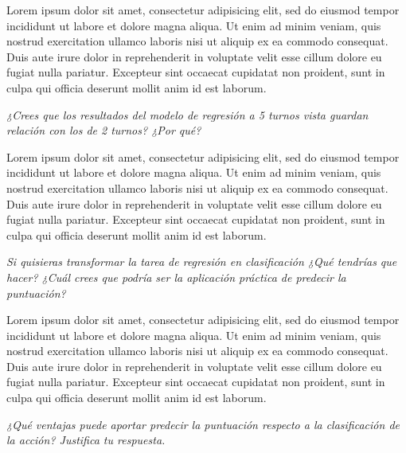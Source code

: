 \documentclass[12pt]{article}
\begin{document}
Lorem ipsum dolor sit amet, consectetur adipisicing elit, sed do eiusmod tempor incididunt ut labore et dolore magna aliqua. Ut enim ad minim veniam, quis nostrud exercitation ullamco laboris nisi ut aliquip ex ea commodo consequat. Duis aute irure dolor in reprehenderit in voluptate velit esse cillum dolore eu fugiat nulla pariatur. Excepteur sint occaecat cupidatat non proident, sunt in culpa qui officia deserunt mollit anim id est laborum.

\begin{center}
    \vspace{0.5cm} \emph{¿Crees que los resultados del modelo de regresión a 5 turnos vista guardan relación con los de 2 turnos? ¿Por qué?}
    \vspace{0.5cm}
\end{center}

Lorem ipsum dolor sit amet, consectetur adipisicing elit, sed do eiusmod tempor incididunt ut labore et dolore magna aliqua. Ut enim ad minim veniam, quis nostrud exercitation ullamco laboris nisi ut aliquip ex ea commodo consequat. Duis aute irure dolor in reprehenderit in voluptate velit esse cillum dolore eu fugiat nulla pariatur. Excepteur sint occaecat cupidatat non proident, sunt in culpa qui officia deserunt mollit anim id est laborum.

\begin{center}
    \vspace{0.5cm} \emph{Si quisieras transformar la tarea de regresión en clasificación ¿Qué tendrías que hacer? ¿Cuál crees que podría ser la aplicación práctica de predecir la puntuación?}
    \vspace{0.5cm}
\end{center}

Lorem ipsum dolor sit amet, consectetur adipisicing elit, sed do eiusmod tempor incididunt ut labore et dolore magna aliqua. Ut enim ad minim veniam, quis nostrud exercitation ullamco laboris nisi ut aliquip ex ea commodo consequat. Duis aute irure dolor in reprehenderit in voluptate velit esse cillum dolore eu fugiat nulla pariatur. Excepteur sint occaecat cupidatat non proident, sunt in culpa qui officia deserunt mollit anim id est laborum.

\begin{center}
    \vspace{0.5cm} \emph{¿Qué ventajas puede aportar predecir la puntuación respecto a la clasificación de la acción? Justifica tu respuesta.}
    \vspace{0.5cm}
\end{center}
\end{document}

